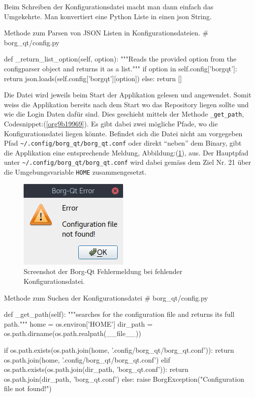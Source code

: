 Beim Schreiben der Konfigurationsdatei macht man dann einfach das Umgekehrte.
Man konvertiert eine Python Liste in einen \gls{json} String.

\begin{sexylisting}[label=orgd4f11c4]{Methode zum Parsen von JSON Listen in Konfigurationsdateien.}
# borg_qt/config.py

def _return_list_option(self, option):
    """Reads the provided option from the configparser object and returns
    it as a list."""
    if option in self.config['borgqt']:
        return json.loads(self.config['borgqt'][option])
    else:
        return []
\end{sexylisting}

Die Datei wird jeweils beim Start der Applikation gelesen und angewendet. Somit
weiss die Applikation bereits nach dem Start wo das Repository liegen sollte
und wie die Login Daten dafür sind. Dies geschieht mittels der Methode
\texttt{\_get\_path}, Codesnippet:(\ref{org9b19969}). Es gibt dabei zwei mögliche Pfade,
wo die Konfigurationsdatei liegen könnte. Befindet sich die Datei nicht am
vorgegeben Pfad \texttt{\textasciitilde{}/.config/borg\_qt/borg\_qt.conf} oder direkt "`neben"' dem
Binary, gibt die Applikation eine entsprechende Meldung,
Abbildung:(\ref{fig:orgb4e2c3c}), aus. Der Hauptpfad unter
\texttt{\textasciitilde{}/.config/borg\_qt/borg\_qt.conf} wird dabei gemäss dem Ziel Nr. 21 über die
Umgebungsvariable \texttt{HOME} zusammengesetzt.

\begin{figure}[H]
\centering
\includegraphics[width=.3\textwidth]{pictures/borgqt_missing_config.png}
\caption{\label{fig:orgb4e2c3c}
Screenshot der Borg-Qt Fehlermeldung bei fehlender Konfigurationsdatei.}
\end{figure}

\begin{sexylisting}[label=org9b19969]{Methode zum Suchen der Konfigurationsdatei}
# borg_qt/config.py

def _get_path(self):
    """searches for the configuration file and returns its full path."""
    home = os.environ['HOME']
    dir_path = os.path.dirname(os.path.realpath(__file__))

    if os.path.exists(os.path.join(home, '.config/borg_qt/borg_qt.conf')):
        return os.path.join(home, '.config/borg_qt/borg_qt.conf')
    elif os.path.exists(os.path.join(dir_path, 'borg_qt.conf')):
        return os.path.join(dir_path, 'borg_qt.conf')
    else:
        raise BorgException("Configuration file not found!")
\end{sexylisting}
